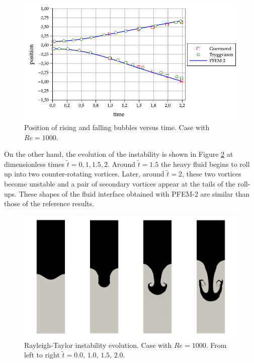 \begin{figure}[H]
  \begin{center}
      \includegraphics[width=\columnwidth]{images/rayleigh_1.pdf}
  \end{center}
  \caption{\label{fg:rayleigh-rf} Position of rising and falling bubbles versus time. Case with $Re=1000$.}
\end{figure}

On the other hand, the evolution of the instability is shown in Figure \ref{fg:rayleigh-screenshots} at dimensionless times $\widetilde{t}=0, 1, 1.5, 2$. Around $\widetilde{t}=1.5$ the heavy fluid begins to roll up into two counter-rotating vortices. Later, around $\widetilde{t} = 2$, these two vortices become unstable and a pair of secondary vortices appear at the tails of the roll-ups. These shapes of the fluid interface obtained with PFEM-2 are similar than those of the reference results.


\begin{figure}[htbp]
  \begin{center}
      \includegraphics[width=\columnwidth]{images/rayleigh_2.jpg}
  \end{center}
  \caption{\label{fg:rayleigh-screenshots} Rayleigh-Taylor instability evolution. Case with $Re=1000$. From left to right $\widetilde{t} =0.0$, $1.0$, $1.5$, $2.0$.}
\end{figure}
\afterpage{\clearpage}
